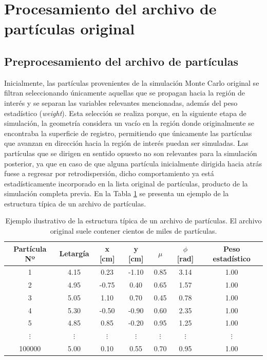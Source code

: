 \section{Procesamiento del archivo de partículas original}
\subsection{Preprocesamiento del archivo de partículas}
Inicialmente, las partículas provenientes de la simulación Monte Carlo original se filtran seleccionando únicamente aquellas que se propagan hacia la región de interés y se separan las variables relevantes mencionadas, además del peso estadístico (\textit{weight}). Esta selección se realiza porque, en la siguiente etapa de simulación, la geometría considera un vacío en la región donde originalmente se encontraba la superficie de registro, permitiendo que únicamente las partículas que avanzan en dirección hacia la región de interés puedan ser simuladas. Las partículas que se dirigen en sentido opuesto no son relevantes para la simulación posterior, ya que en caso de que alguna partícula inicialmente dirigida hacia atrás fuese a regresar por retrodispersión, dicho comportamiento ya está estadísticamente incorporado en la lista original de partículas, producto de la simulación completa previa. En la Tabla \ref{tab:estructura_trackfile} se presenta un ejemplo de la estructura típica de un archivo de partículas.

\begin{table}[h]
    \centering
    \begin{tabular}{ccccccc}
        \toprule
        \textbf{Partícula Nº} & \textbf{Letargía} & \textbf{x [cm]} & \textbf{y [cm]} & \textbf{$\mu$} & \textbf{$\phi$ [rad]} & \textbf{Peso estadístico} \\ 
        \midrule
        1       & 4.15 &  0.23  & -1.10 &  0.85 & 3.14 & 1.00 \\
        2       & 4.95 & -0.75  &  0.40 & 0.65 & 1.57 & 1.00 \\
        3       & 5.05 &  1.10  &  0.70 &  0.45 & 0.78 & 1.00 \\
        4       & 5.30 & -0.50  & -0.90 &  0.60 & 2.35 & 1.00 \\
        5       & 4.85 &  0.85  & -0.20 & 0.95 & 1.25 & 1.00 \\
        $\vdots$ & $\vdots$ & $\vdots$ & $\vdots$ & $\vdots$ & $\vdots$ & $\vdots$ \\[0.2cm]
        100000  & 5.00 &  0.10  &  0.55 & 0.70 & 0.95 & 1.00 \\
        \bottomrule
    \end{tabular}
    \caption{Ejemplo ilustrativo de la estructura típica de un archivo de partículas. El archivo original suele contener cientos de miles de partículas.}
    \label{tab:estructura_trackfile}
\end{table}

